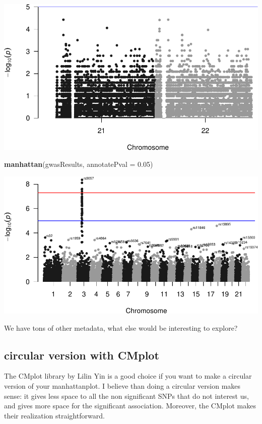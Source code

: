\documentclass[
]{article}
\newenvironment{Shaded}{\begin{snugshade}}{\end{snugshade}}
\newcommand{\DataTypeTok}[1]{\textcolor[rgb]{0.13,0.29,0.53}{#1}}
\newcommand{\FloatTok}[1]{\textcolor[rgb]{0.00,0.00,0.81}{#1}}
\newcommand{\KeywordTok}[1]{\textcolor[rgb]{0.13,0.29,0.53}{\textbf{#1}}}
\newcommand{\NormalTok}[1]{#1}
\begin{document}
\includegraphics{GWASvisualizations_files/figure-latex/unnamed-chunk-11-1.pdf}

\begin{Shaded}
\begin{Highlighting}[]
\KeywordTok{manhattan}\NormalTok{(gwasResults, }\DataTypeTok{annotatePval =} \FloatTok{0.05}\NormalTok{)}
\end{Highlighting}
\end{Shaded}

\includegraphics{GWASvisualizations_files/figure-latex/unnamed-chunk-11-2.pdf}

We have tons of other metadata, what else would be interesting to
explore?

\hypertarget{circular-version-with-cmplot}{%
\subsection{circular version with
CMplot}\label{circular-version-with-cmplot}}

The CMplot library by Lilin Yin is a good choice if you want to make a
circular version of your manhattanplot. I believe than doing a circular
version makes sense: it gives less space to all the non significant SNPs
that do not interest us, and gives more space for the significant
association. Moreover, the CMplot makes their realization
straightforward.
\end{document}
